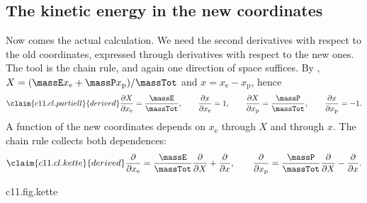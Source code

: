 \subsection{The kinetic energy in the new coordinates}\label{c11.s2.2}

Now comes the actual calculation. We need the second derivatives with respect to the old
coordinates, expressed through derivatives with respect to the new ones. The tool is the
chain rule, and again one direction of space suffices. By ,
$X = (\massE x_{\mathrm{e}} + \massP x_{\mathrm{p}})/\massTot$ and
$x = x_{\mathrm{e}} - x_{\mathrm{p}}$, hence
\begin{equation}\label{c11.eq.partiell}\claim{c11.cl.partiell}{derived}
  \frac{\partial X}{\partial x_{\mathrm{e}}} = \frac{\massE}{\massTot},
  \qquad
  \frac{\partial x}{\partial x_{\mathrm{e}}} = 1,
  \qquad
  \frac{\partial X}{\partial x_{\mathrm{p}}} = \frac{\massP}{\massTot},
  \qquad
  \frac{\partial x}{\partial x_{\mathrm{p}}} = -1.
\end{equation}
A function of the new coordinates depends on $x_{\mathrm{e}}$ through $X$ and through
$x$. The chain rule collects both dependences:
\begin{equation}\label{c11.eq.kette}\claim{c11.cl.kette}{derived}
  \frac{\partial}{\partial x_{\mathrm{e}}}
  = \frac{\massE}{\massTot}\frac{\partial}{\partial X} + \frac{\partial}{\partial x},
  \qquad
  \frac{\partial}{\partial x_{\mathrm{p}}}
  = \frac{\massP}{\massTot}\frac{\partial}{\partial X} - \frac{\partial}{\partial x}.
\end{equation}

\begin{tpcfigure}{c11.fig.kette}
  \caption{The chain rule \eqref{c11.eq.kette} as a diagram. A function of $X$ and $x$ depends on $x_{\mathrm{e}}$ along two routes (solid) and on $x_{\mathrm{p}}$ along two routes (dashed). Each arrow carries the factor of \eqref{c11.eq.partiell}; the derivative with respect to an old coordinate is the sum over its two routes.}
\end{tpcfigure}

